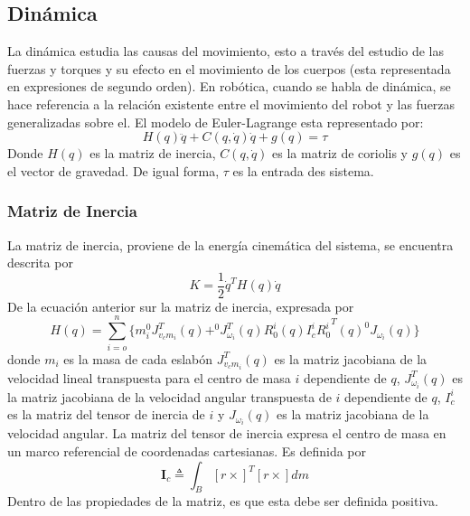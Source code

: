 \subsection{Dinámica}
    La dinámica estudia las causas del movimiento, esto a través del estudio de las fuerzas y torques y su efecto en
    el movimiento de los cuerpos (esta representada en expresiones de segundo orden). En robótica, cuando se habla de
    dinámica, se hace referencia a la relación existente entre el movimiento del robot y las fuerzas generalizadas sobre el. 
    El modelo de Euler-Lagrange esta representado por: 
    \begin{equation*}
        H(q)\ddot{q} + C(q, \dot{q}) \dot{q} + g(q) = \tau
    \end{equation*}
    Donde $H(q)$ es la matriz de inercia, $C(q, \dot{q})$ es la matriz de coriolis  y $g(q)$ es el vector de gravedad.
    De igual forma, $\tau$ es la entrada des sistema.\\ 
    \subsubsection{Matriz de Inercia}
    La matriz de inercia, proviene de la energía cinemática del sistema, se encuentra descrita por
    \begin{equation*}
        K = \frac{1}{2} \dot{q}^T H(q)\dot{q}
    \end{equation*}
    De la ecuación anterior sur la matriz de inercia, expresada por
    \begin{equation*}
        H(q) = \sum_{i=o} ^n \{ m_i ^0 J_{v_cm_i} ^T(q) + ^0J_{\omega_i} ^T (q) R_0 ^i(q) I_c ^i {R_0 ^i}^T (q) ^0 J_{\omega_i} (q) \}
    \end{equation*}
    donde $m_i$ es la masa de cada eslabón $J_{v_cm_i}^T(q)$ es la matriz jacobiana de la velocidad lineal transpuesta para
    el centro de masa $i$ dependiente de $q$, $J_{\omega_i} ^T (q)$ es la matriz jacobiana de la velocidad angular transpuesta
    de $i$  dependiente de $q$, $I_c ^i$ es la matriz del tensor de inercia de $i$ y $J_{\omega_i} (q)$ es la matriz jacobiana
    de la velocidad angular.
    La matriz del tensor de inercia expresa el centro de masa en un marco referencial de coordenadas cartesianas. Es definida por
    \begin{equation*}
        \textbf{I}_c \triangleq \int_B [r \times]^T [r \times] dm 
    \end{equation*}
    Dentro de las propiedades de la matriz, es que esta debe ser definida positiva. \\

